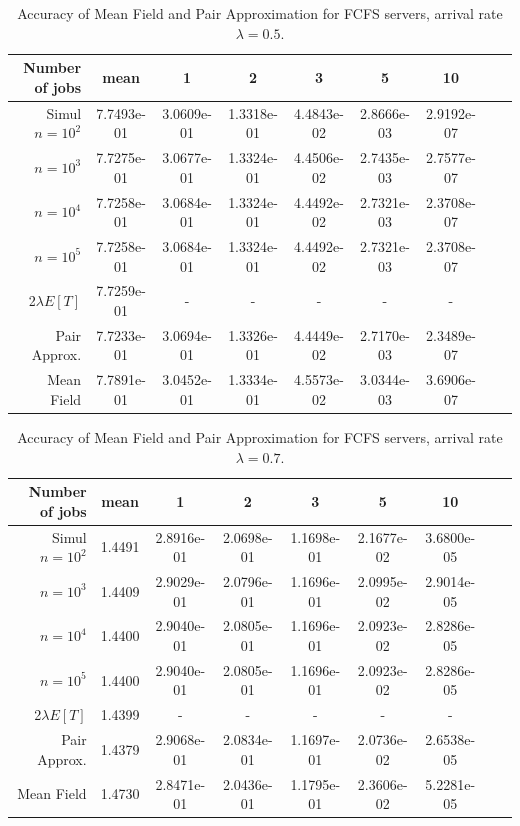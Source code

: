 \documentclass[acmsmall,nonacm]{acmart}
\newcommand\red[1]{{#1}}
\begin{document}
\begin{table}[ht]
    \centering
    \begin{tabular}{|r|c|c|c|c|c|c|c|c|}
    \hline 
        Number of jobs & mean & 1 & 2 & 3 & 5 & 10\\ \hline
         \hline
Simul $n=10^2$ &       7.7493e-01   &3.0609e-01  & 1.3318e-01&   4.4843e-02 &  2.8666e-03  & 2.9192e-07\\
$n=10^3$ &  7.7275e-01  & 3.0677e-01   &1.3324e-01&   4.4506e-02  & 2.7435e-03  & 2.7577e-07\\
$n=10^4$ &  7.7258e-01  & 3.0684e-01   &1.3324e-01&   4.4492e-02  & 2.7321e-03  & 2.3708e-07\\
$n=10^5$ &  7.7258e-01  & 3.0684e-01   &1.3324e-01&   4.4492e-02  & 2.7321e-03 &  2.3708e-07\\\hline
\red{2$\lambda E[T]$ \cite{gardner2017redundancy}} & \red{7.7259e-01}  &  -& - &-   &-  & -  \\\hline
Pair Approx. & 7.7233e-01 &  3.0694e-01 &  1.3326e-01 &  4.4449e-02  & 2.7170e-03  & 2.3489e-07\\\hline
Mean Field &  7.7891e-01  & 3.0452e-01   &1.3334e-01&   4.5573e-02  & 3.0344e-03 &  3.6906e-07\\
 \hline
    \end{tabular}
    \caption{Accuracy of Mean Field and Pair Approximation for FCFS servers, arrival rate $\lambda=0.5$. }
    \label{tab:simulPAIR05FCFS}
\end{table}

\begin{table}[ht]
    \centering
    \begin{tabular}{|r|c|c|c|c|c|c|c|c|}
    \hline
          Number of jobs & mean & 1 & 2 & 3 & 5 & 10\\ \hline
         \hline
Simul $n=10^2$  &  1.4491 &  2.8916e-01&   2.0698e-01&   1.1698e-01 &  2.1677e-02 &  3.6800e-05\\
 $n=10^3$ & 1.4409 &  2.9029e-01 &  2.0796e-01 &  1.1696e-01  & 2.0995e-02  & 2.9014e-05\\
  $n=10^4$& 1.4400 &  2.9040e-01 &  2.0805e-01 &  1.1696e-01  & 2.0923e-02  & 2.8286e-05\\
  $n=10^5$& 1.4400 &  2.9040e-01 &  2.0805e-01 &  1.1696e-01  & 2.0923e-02  & 2.8286e-05\\\hline
\red{2$\lambda E[T]$ \cite{gardner2017redundancy}} & \red{1.4399}  &  -& - &-   &-  & -  \\\hline
 Pair Approx. & 1.4379 &  2.9068e-01 &  2.0834e-01 &  1.1697e-01  & 2.0736e-02  & 2.6538e-05\\\hline
Mean Field  & 1.4730 &  2.8471e-01 &  2.0436e-01 &  1.1795e-01  & 2.3606e-02  & 5.2281e-05\\
    \hline 
    \end{tabular}
    \caption{Accuracy of Mean Field and Pair Approximation for FCFS servers, arrival rate $\lambda=0.7$. }
    \label{tab:simulPAIR07FCFS}
\end{table}
\end{document}
